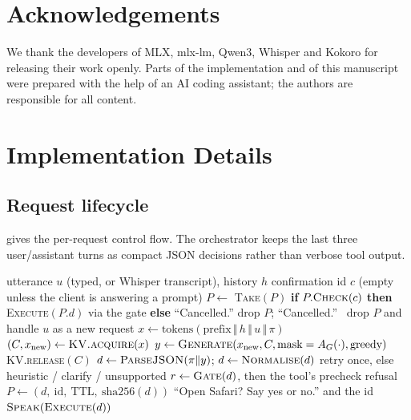 \documentclass[10pt,twocolumn,letterpaper]{article}
\theoremstyle{definition}
\begin{document}
\section*{Acknowledgements}
We thank the developers of MLX, mlx-lm, Qwen3, Whisper and Kokoro for releasing their work openly.
Parts of the implementation and of this manuscript were prepared with the help of an AI coding
assistant; the authors are responsible for all content.

{\small


}

\clearpage
\onecolumn
\appendix

\section{Implementation Details}\label{app:impl}\label{sec:impl}

\subsection{Request lifecycle}
 gives the per-request control flow. The orchestrator keeps the last three
user/assistant turns as compact JSON decisions rather than verbose tool output.

\begin{algorithm}[t]
\caption{Handling one request in R2}\label{alg:request}
\small
\begin{algorithmic}[1]
\Require utterance $u$ (typed, or Whisper transcript), history $h$
\Require confirmation id $c$ (empty unless the client is answering a prompt)
   \State $P\gets$ \textsc{Take}$(P)$ 
    \State \textbf{if} $P.\textsc{Check}(c)$ \textbf{then} \Return \textsc{Execute}$(P.d)$ via the gate
    \State \textbf{else} \Return ``Cancelled.'' 
   \State drop $P$; \Return ``Cancelled.''
  \Else\ drop $P$ and handle $u$ as a new request
  \EndIf
\EndIf
\State $x \gets \mathrm{tokens}(\text{prefix}\,\Vert\,h\,\Vert\,u\,\Vert\,\pi)$
\State $(C, x_{\text{new}}) \gets \textsc{KV.acquire}(x)$ 
\State $y \gets \textsc{Generate}(x_{\text{new}}, C, \text{mask}=A_G(\cdot), \text{greedy})$
\State \textsc{KV.release}$(C)$ 
\State $d \gets \textsc{ParseJSON}(\pi\Vert y)$; $d\gets\textsc{Normalise}(d)$ 
 \State retry once, else heuristic / clarify / unsupported \EndIf
\State $r \gets \textsc{Gate}(d)$, then the tool's precheck 
 \Return refusal
 \State $P\gets(d,\ \text{id},\ \text{TTL},\ \mathrm{sha256}(d))$
  \State \Return ``Open Safari? Say yes or no.'' and the id
\Else\ \Return $\textsc{Speak}(\textsc{Execute}(d))$
\EndIf
\end{algorithmic}
\end{algorithm}
\end{document}

